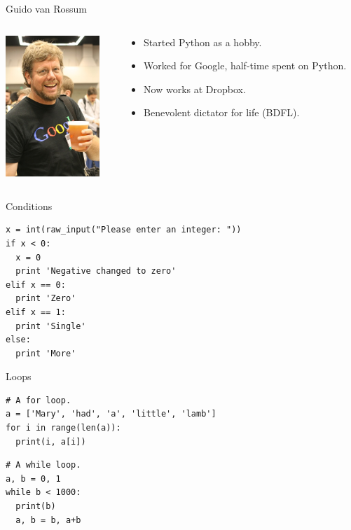 \begin{frame}{Guido van Rossum}
  \begin{columns}
    \begin{column}{1.5in}
      \includegraphics[width=1.4in]{img/guido_van_rossum.jpg}
    \end{column}
    \begin{column}{0.7\textwidth}
      \begin{itemize}
        \item Started Python as a hobby.
        \vspace{0.25cm}
        \item Worked for Google, half-time spent on Python.
        \vspace{0.25cm}
        \item Now works at Dropbox.
        \vspace{0.25cm}
        \item Benevolent dictator for life (BDFL).
      \end{itemize}
    \end{column}
  \end{columns}
\end{frame}

\begin{frame}[fragile]{Conditions}
  \begin{verbatim}
x = int(raw_input("Please enter an integer: "))
if x < 0:
  x = 0
  print 'Negative changed to zero'
elif x == 0:
  print 'Zero'
elif x == 1:
  print 'Single'
else:
  print 'More'
  \end{verbatim}
\end{frame}

\begin{frame}[fragile]{Loops}
  \begin{verbatim}
# A for loop.
a = ['Mary', 'had', 'a', 'little', 'lamb']
for i in range(len(a)):
  print(i, a[i])
  \end{verbatim}
  \begin{verbatim}
# A while loop.
a, b = 0, 1
while b < 1000:
  print(b)
  a, b = b, a+b
  \end{verbatim}
\end{frame}

